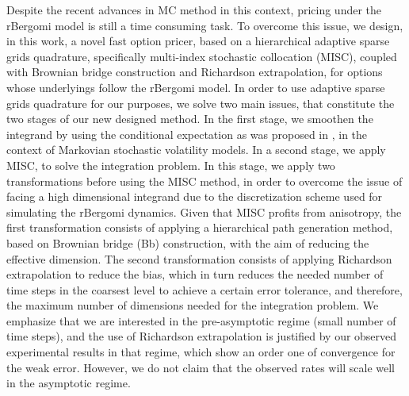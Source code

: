 Despite the recent advances in MC method in this context, pricing under the rBergomi model is still a time consuming task. To overcome this issue,  we design,  in this work,  a novel fast option pricer,  based on a  hierarchical adaptive sparse grids quadrature, specifically  multi-index stochastic collocation (MISC), coupled with Brownian bridge construction and Richardson extrapolation, for options whose underlyings  follow the rBergomi model.  In order to use adaptive sparse grids quadrature for our purposes, we  solve two main issues, that constitute the two stages of our new designed method. In the first stage, we smoothen the integrand by using the conditional expectation as was proposed in \cite{romano1997contingent}, in the context of Markovian stochastic volatility  models.   In a second stage, we apply  MISC, to solve the integration problem. In this stage, we apply two transformations before using the MISC method, in order to overcome the issue of facing a high dimensional integrand due to the discretization scheme used for simulating the rBergomi dynamics. Given that MISC profits from anisotropy, the first transformation consists of applying a hierarchical  path generation method, based on Brownian
bridge (Bb) construction, with the aim of reducing the effective dimension. The second transformation consists of applying Richardson extrapolation to reduce the bias, which in turn reduces the needed number of time steps in the coarsest level to achieve a certain error tolerance, and therefore,  the maximum number of dimensions needed for the integration problem. We emphasize that we are interested in  the pre-asymptotic regime (small number of time steps), and  the use of Richardson extrapolation is justified by our observed experimental results in that regime,  which show an order one of convergence for the weak error. However, we do not claim that the observed rates will scale well in the asymptotic regime. 


